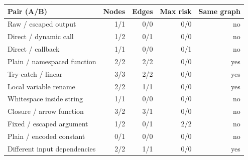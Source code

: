 \begin{tabular}{@{}lrrrr@{}}
\toprule
Pair (A/B) & Nodes & Edges & Max risk & Same graph \\ \midrule
Raw / escaped output & 1/1 & 0/0 & 0/0 & no \\
Direct / dynamic call & 1/2 & 0/1 & 0/0 & no \\
Direct / callback & 1/1 & 0/0 & 0/1 & no \\
Plain / namespaced function & 2/2 & 2/2 & 0/0 & yes \\
Try-catch / linear & 3/3 & 2/2 & 0/0 & yes \\
Local variable rename & 2/2 & 1/1 & 0/0 & yes \\
Whitespace inside string & 1/1 & 0/0 & 0/0 & no \\
Closure / arrow function & 3/2 & 3/1 & 0/0 & no \\
Fixed / escaped argument & 1/2 & 0/1 & 2/2 & no \\
Plain / encoded constant & 0/1 & 0/0 & 0/0 & no \\
Different input dependencies & 2/2 & 1/1 & 0/0 & yes \\
\bottomrule
\end{tabular}
